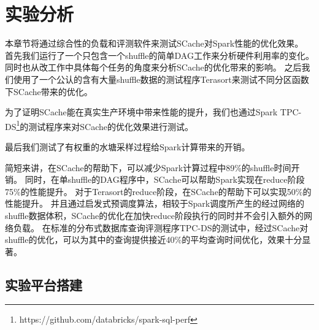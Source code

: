 
\chapter{实验分析}
\label{chap:evaluation}

本章节将通过综合性的负载和评测软件来测试SCache对Spark性能的优化效果。
首先我们运行了一个只包含一个shuffle的简单DAG工作来分析硬件利用率的变化。
同时也从改工作中具体每个任务的角度来分析SCache的优化带来的影响。
之后我们使用了一个公认的含有大量shuffle数据的测试程序Terasort\cite{terasort}来测试不同分区函数下SCache带来的优化。

为了证明SCache能在真实生产环境中带来性能的提升，我们也通过Spark TPC-DS\footnote{https://github.com/databricks/spark-sql-perf}的测试程序来对SCache的优化效果进行测试。

最后我们测试了有权重的水塘采样过程给Spark计算带来的开销。

简短来讲，在SCache的帮助下，可以减少Spark计算过程中89\%的shuffle时间开销。
同时，在单shuffle的DAG程序中，SCache可以帮助Spark实现在reduce阶段75\%的性能提升。
对于Terasort的reduce阶段，在SCache的帮助下可以实现50\%的性能提升。
并且通过启发式预调度算法，相较于Spark调度所产生的经过网络的shuffle数据体积，SCache的优化在加快reduce阶段执行的同时并不会引入额外的网络负载。
在标准的分布式数据库查询评测程序TPC-DS的测试中，经过SCache对shuffle的优化，可以为其中的查询提供接近40\%的平均查询时间优化，效果十分显著。

\section{实验平台搭建}

